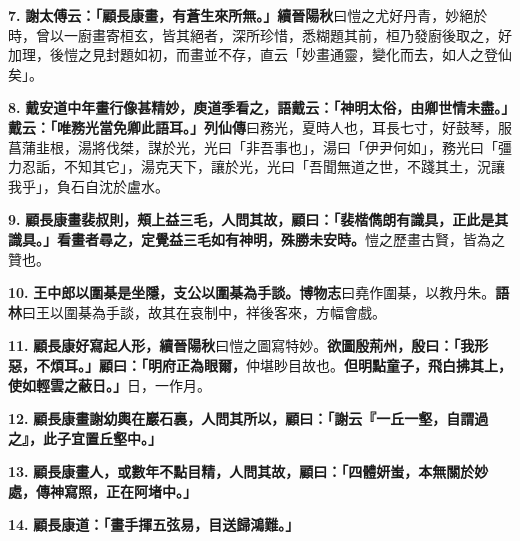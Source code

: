 \textbf{7.} \textbf{謝太傅云：「顧長康畫，有蒼生來所無。」}{\footnotesize \textbf{續晉陽秋}曰愷之尤好丹青，妙絕於時，曾以一廚畫寄桓玄，皆其絕者，深所珍惜，悉糊題其前，桓乃發廚後取之，好加理，後愷之見封題如初，而畫並不存，直云「妙畫通靈，變化而去，如人之登仙矣」。}

\textbf{8.} \textbf{戴安道中年畫行像甚精妙，庾道季看之，語戴云：「神明太俗，由卿世情未盡。」戴云：「唯務光當免卿此語耳。」}{\footnotesize \textbf{列仙傳}曰務光，夏時人也，耳長七寸，好鼓琴，服菖蒲韭根，湯將伐桀，謀於光，光曰「非吾事也」，湯曰「伊尹何如」，務光曰「彊力忍詬，不知其它」，湯克天下，讓於光，光曰「吾聞無道之世，不踐其土，況讓我乎」，負石自沈於盧水。}

\textbf{9.} \textbf{顧長康畫裴叔則，頰上益三毛，人問其故，顧曰：「裴楷儁朗有識具，正此是其識具。」看畫者尋之，定覺益三毛如有神明，殊勝未安時。}{\footnotesize 愷之歷畫古賢，皆為之贊也。}

\textbf{10.} \textbf{王中郎以圍棊是坐隱，支公以圍棊為手談。}{\footnotesize \textbf{博物志}曰堯作圍棊，以教丹朱。\textbf{語林}曰王以圍棊為手談，故其在哀制中，祥後客來，方幅會戲。}

\textbf{11.} \textbf{顧長康好寫起人形，}{\footnotesize \textbf{續晉陽秋}曰愷之圖寫特妙。}\textbf{欲圖殷荊州，殷曰：「我形惡，不煩耳。」顧曰：「明府正為眼爾，}{\footnotesize 仲堪眇目故也。}\textbf{但明點童子，飛白拂其上，使如輕雲之蔽日。」}{\footnotesize 日，一作月。}

\textbf{12.} \textbf{顧長康畫謝幼輿在巖石裏，人問其所以，顧曰：「謝云『一丘一壑，自謂過之』，此子宜置丘壑中。」}

\textbf{13.} \textbf{顧長康畫人，或數年不點目精，人問其故，顧曰：「四體妍蚩，本無關於妙處，傳神寫照，正在阿堵中。」}

\textbf{14.} \textbf{顧長康道：「畫手揮五弦易，目送歸鴻難。」}